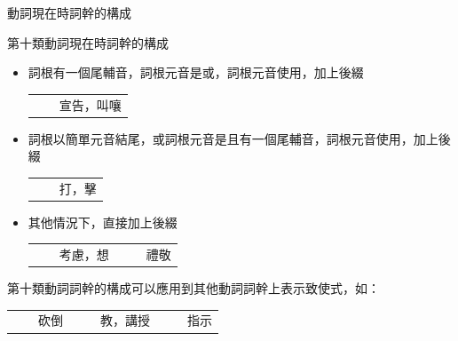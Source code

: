 \documentclass[aspectratio=169]{beamer}
\begin{document}
\begin{frame}{動詞現在時詞幹的構成}
    \small
    \begin{block}{第十類動詞現在時詞幹的構成}
        \begin{itemize}
            \item 詞根有一個尾輔音，詞根元音是或，詞根元音使用，加上後綴\\
            \begin{tabular}{V}
                 &  & 宣告，叫嚷 \\
            \end{tabular}
            \item 詞根以簡單元音結尾，或詞根元音是且有一個尾輔音，詞根元音使用，加上後綴\\
            \begin{tabular}{V}
                 &  & 打，擊 \\
            \end{tabular}
            \item 其他情況下，直接加上後綴 \\
            \begin{tabular}{V}
                 &  & 考慮，想 &
                 &  & 禮敬 \\
            \end{tabular}
        \end{itemize}
    \end{block}

    第十類動詞詞幹的構成可以應用到其他動詞詞幹上表示致使式，如：\\
    \hspace{2em}\begin{tabular}{V}
         &  & 砍倒 &
         &  & 教，講授 &
         &  & 指示 \\
    \end{tabular}
\end{frame}
\end{document}
